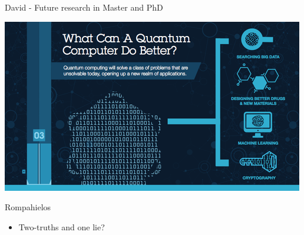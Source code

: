 \documentclass{beamer}
\begin{document}
\begin{frame}{David - Future research in Master and PhD}
   \begin{center}
      \includegraphics[width=\textwidth]{figures/quantum.png}
   \end{center}
\end{frame}

\begin{frame}{Rompahielos}
   \begin{itemize}
      \item Two-truths and one lie?
   \end{itemize}
\end{frame}
\end{document}
